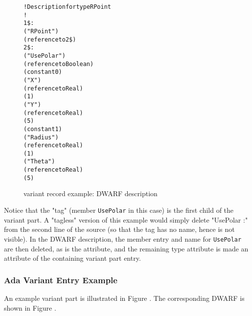 \begin{figure}[ht]
\begin{dwflisting}
\begin{alltt}
! Description for type RPoint
!
1\$: \DWTAGstructuretype
        \DWATname("RPoint")
        \DWTAGvariantpart
            \DWATdiscr (reference to 2\$)
2\$:         \DWTAGmember
                \DWATname("UsePolar")
                \DWATtype(reference to Boolean)
            \DWTAGvariant
                \DWATdiscrvalue(constant 0)
                \DWTAGmember
                    \DWATname("X")
                    \DWATtype(reference to Real)
                    \DWATdatamemberlocation(1)
                \DWTAGmember
                    \DWATname("Y")
                    \DWATtype(reference to Real)
                    \DWATdatamemberlocation(5)
            \DWTAGvariant
                \DWATdiscrvalue(constant 1)
                \DWTAGmember
                    \DWATname("Radius")
                    \DWATtype(reference to Real)
                    \DWATdatamemberlocation(1)
                \DWTAGmember
                    \DWATname("Theta")
                    \DWATtype(reference to Real)
                    \DWATdatamemberlocation(5)
\end{alltt}
\end{dwflisting}
\caption{\Pascal{} variant record example: DWARF description}
\label{fig:pascalvariantrecordexampledwarfdescription}
\end{figure}

\bb
Notice that the "tag" (member \texttt{UsePolar} in this case)
is the first child of the variant part.
A "tagless" version of this example would simply delete "UsePolar :" 
from the second line of the source (so that the tag has no name, 
hence is not visible). In the DWARF description, the
member entry and name for \texttt{UsePolar} are then deleted, as is 
the \DWATdiscr{} attribute, and the remaining type
attribute is made an attribute of the containing variant part entry. 
\eb

\bb
\subsubsection{Ada Variant Entry Example}
\label{app:adavariantentryexample}
An \Ada{} example variant part is illustrated in Figure
.
The corresponding DWARF is shown in Figure
.
\eb

